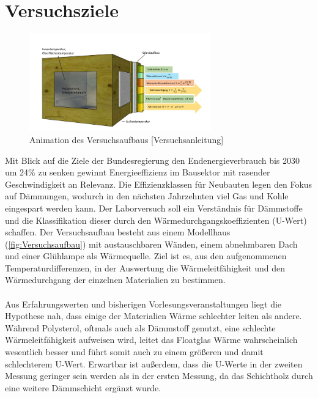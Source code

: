 \section{Versuchsziele}
\begin{figure}[!h]
		\centering
		\includegraphics[width=0.7\textwidth]{Abbildungen/Thurow_Deckblatt}
		\caption{Animation des Versuchsaufbaus [Versuchsanleitung] }
		\label{fig:Versuchsaufbau}
\end{figure}

Mit Blick auf die Ziele der Bundesregierung den Endenergieverbrauch bis 2030 um 24\% zu senken gewinnt Energieeffizienz im Bausektor mit rasender Geschwindigkeit 
an Relevanz. Die Effizienzklassen für Neubauten legen den Fokus auf Dämmungen, wodurch in den nächsten Jahrzehnten viel Gas und Kohle eingespart werden kann. 
Der Laborversuch soll ein Verständnis für Dämmstoffe und die Klassifikation dieser durch den Wärmedurchgangskoeffizienten (U-Wert) schaffen.  
Der Versuchsaufbau besteht aus einem Modellhaus (\autoref{fig:Versuchsaufbau}) mit austauschbaren Wänden, einem abnehmbaren Dach und einer Glühlampe als Wärmequelle.
 Ziel ist es, aus den aufgenommenen Temperaturdifferenzen, in der Auswertung die Wärmeleitfähigkeit und den Wärmedurchgang der einzelnen Materialien zu bestimmen.\\\\
Aus Erfahrungswerten und bisherigen Vorlesungsveranstaltungen liegt die Hypothese nah, dass einige der Materialien Wärme schlechter leiten als andere. 
Während Polysterol, oftmals auch als Dämmstoff genutzt, eine schlechte Wärmeleitfähigkeit aufweisen wird, leitet das Floatglas Wärme wahrscheinlich wesentlich besser und 
führt somit auch zu einem größeren und damit schlechterem U-Wert. Erwartbar ist außerdem, dass die U-Werte in der zweiten Messung geringer sein werden als in der ersten Messung, da das Schichtholz durch 
eine weitere Dämmschicht ergänzt wurde.